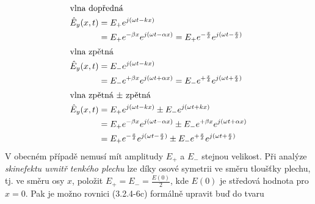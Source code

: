         \begin{subequations}
          \begin{align}
            \shortintertext{vlna dopředná}
            \hat{E}_y(x,t) 
              &= E_+e^{j(\omega t - kx)}                                                \nonumber \\
              &= E_+e^{-\beta x}e^{j(\omega t - \alpha x)}         
               = E_+e^{-\frac{x}{\delta}}e^{j(\omega t-\frac{x}{\delta})} \label{ES:eq_elmagp49a} \\
            \shortintertext{vlna zpětná}
            \hat{E}_y(x,t) 
              &= E_-e^{j(\omega t - kx)}                                                \nonumber \\
              &= E_-e^{+\beta x}e^{j(\omega t+\alpha x)}    
               = E_-e^{+\frac{x}{\delta}}e^{j(\omega t+\frac{x}{\delta})} \label{ES:eq_elmagp49b} \\
            \shortintertext{vlna zpětná \(\pm\) zpětná}
            \hat{E}_y(x,t) 
              &= E_+e^{j(\omega t - kx)} \pm E_-e^{j(\omega t + kx)}                    \nonumber \\
              &= E_+e^{-\beta x}e^{j(\omega t - \alpha x)} \pm
                 E_-e^{+\beta x}e^{j(\omega t + \alpha x)}                              \nonumber \\
              &= E_+e^{-\frac{x}{\delta}}e^{j(\omega t - \frac{x}{\delta})}  \pm
                 E_-e^{+\frac{x}{\delta}}e^{j(\omega t + \frac{x}{\delta})}  \label{ES:eq_elmagp49c}
          \end{align}
        \end{subequations}
        V obecném případě nemusí mít amplitudy \(E_+\) a \(E_-\) stejnou velikost. Při analýze 
        \emph{skinefektu uvnitř tenkého plechu} lze díky osové symetrii ve směru tloušťky plechu, 
        tj. ve směru osy \(x\), položit \(E_+ = E_- = \frac{E(0)}{2}\), kde \(E(0)\) je středová 
        hodnota pro \(x = 0\). Pak je možno rovnici (3.2.4-6c) formálně upravit buď do tvaru
